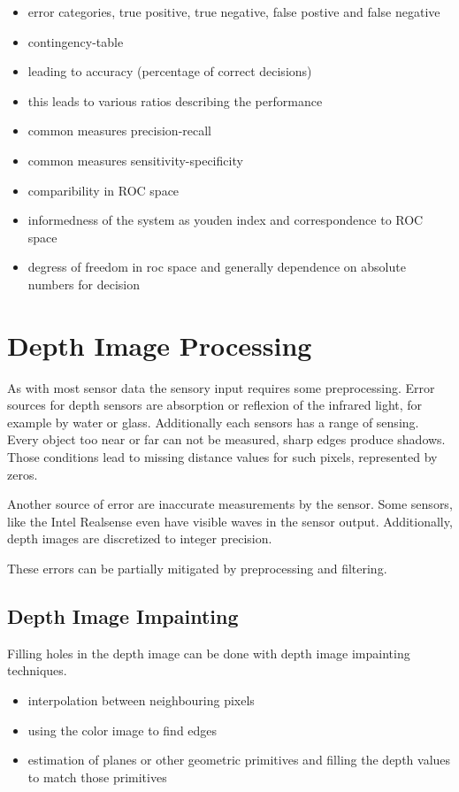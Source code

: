 \begin{itemize}
    \item error categories, true positive, true negative, false postive and false negative
    \item contingency-table
    \item leading to accuracy (percentage of correct decisions)
    \item this leads to various ratios describing the performance 
    \item common measures precision-recall
    \item common measures sensitivity-specificity
    \item comparibility in \gls{ROC} space
    \item informedness of the system as youden index and correspondence to \gls{ROC} space
    \item degress of freedom in roc space and generally dependence on absolute numbers for decision 
\end{itemize}

\section{Depth Image Processing}

As with most sensor data the sensory input requires some preprocessing.
Error sources for depth sensors are absorption or reflexion of the infrared light, for example by water or glass.
Additionally each sensors has a range of sensing.
Every object too near or far can not be measured, sharp edges produce shadows.
Those conditions lead to missing distance values for such pixels, represented by zeros.

Another source of error are inaccurate measurements by the sensor.
Some sensors, like the Intel Realsense even have visible waves in the sensor output.
Additionally, depth images are discretized to integer precision.

These errors can be partially mitigated by preprocessing and filtering.

\subsection{Depth Image Impainting}

Filling holes in the depth image can be done with depth image impainting techniques.

\begin{itemize}
    \item interpolation between neighbouring pixels
    \item using the color image to find edges
    \item estimation of planes or other geometric primitives and filling the depth values to match those primitives
\end{itemize}

